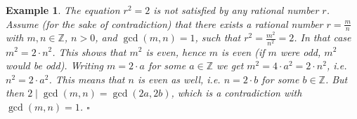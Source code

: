 \documentclass[10pt,varwidth=6in,margin=0.2in,preview]{standalone}
\newtheorem{example}[definition]{Example}
\begin{document}
\begin{flushleft}
\setcounter{section}{1}
\setcounter{definition}{0}
\begin{example}
The equation $r^2 = 2$ is not satisfied by any rational number $r$.
Assume (for the sake of contradiction) that there exists a rational number $r = \frac{m}{n}$ with $m, n \in \mathbb{Z}$, $n > 0$, and $\gcd(m, n) = 1$, such that $r^2 = \frac{m^2}{n^2} = 2$.
In that case $m^2 = 2 \cdot n^2$. 
This shows that $m^2$ is even, hence $m$ is even (if $m$ were odd, $m^2$ would be odd).
Writing $m = 2 \cdot a$ for some $a \in \mathbb{Z}$ we get $m^2 = 4 \cdot a^2 = 2 \cdot n^2$, i.e. $n^2 = 2 \cdot a^2$.
This means that $n$ is even as well, i.e. $n = 2 \cdot b$ for some $b \in \mathbb{Z}$.
But then $2 \mid \gcd(m, n) = \gcd(2a, 2b)$, 
which is a contradiction with $\gcd(m, n) = 1$.
 $\square$
\end{example}



\end{flushleft}
\end{document}
